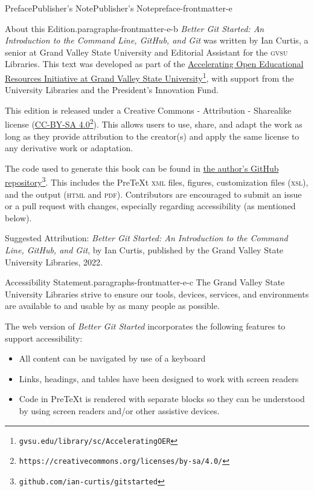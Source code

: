 \documentclass[oneside,10pt,]{book}
\newcommand{\initialism}[1]{\textsc{\MakeLowercase{#1}}}
\newcommand{\pubtitle}[1]{\textsl{#1}}
\begin{document}
\begin{preface}{Preface}{Publisher's Note}{}{Publisher's Note}{}{}{preface-frontmatter-e}
\begin{paragraphs}{About this Edition.}{paragraphs-frontmatter-e-b}%
\pubtitle{Better Git Started: An Introduction to the Command Line, GitHub, and Git} was written by Ian Curtis, a senior at Grand Valley State University and Editorial Assistant for the \initialism{GVSU} Libraries. This text was developed as part of the \href{https://www.gvsu.edu/library/sc/AcceleratingOER}{Accelerating Open Educational Resources Initiative at Grand Valley State University}\footnote{\nolinkurl{gvsu.edu/library/sc/AcceleratingOER}\label{fn-frontmatter-e-b-b-d}}, with support from the University Libraries and the President's Innovation Fund.%
\par
This edition is released under a Creative Commons - Attribution - Sharealike license (\href{https://creativecommons.org/licenses/by-sa/4.0/}{CC-BY-SA 4.0}\footnote{\nolinkurl{https://creativecommons.org/licenses/by-sa/4.0/}\label{fn-frontmatter-e-b-c-b}}). This allows users to use, share, and adapt the work as long as they provide attribution to the creator(s) and apply the same license to any derivative work or adaptation.%
\par
The code used to generate this book can be found in \href{https://github.com/ian-curtis/gitstarted}{the author's GitHub repository}\footnote{\nolinkurl{github.com/ian-curtis/gitstarted}\label{fn-frontmatter-e-b-d-b}}. This includes the PreTeXt \initialism{XML} files, figures, customization files (\initialism{XSL}), and the output (\initialism{HTML} and \initialism{PDF}). Contributors are encouraged to submit an issue or a pull request with changes, especially regarding accessibility (as mentioned below).%
\par
Suggested Attribution: \pubtitle{Better Git Started: An Introduction to the Command Line, GitHub, and Git}, by Ian Curtis, published by the Grand Valley State University Libraries, 2022.%
\end{paragraphs}%
\begin{paragraphs}{Accessibility Statement.}{paragraphs-frontmatter-e-c}%
The Grand Valley State University Libraries strive to ensure our tools, devices, services, and environments are available to and usable by as many people as possible.%
\par
The web version of \pubtitle{Better Git Started} incorporates the following features to support accessibility:%
\begin{itemize}[label=\textbullet]
\item{}All content can be navigated by use of a keyboard%
\item{}Links, headings, and tables have been designed to work with screen readers%
\item{}Code in PreTeXt is rendered with separate blocks so they can be understood by using screen readers and\slash{}or other assistive devices.%
\end{itemize}
%
\end{paragraphs}%
\end{preface}
\end{document}
